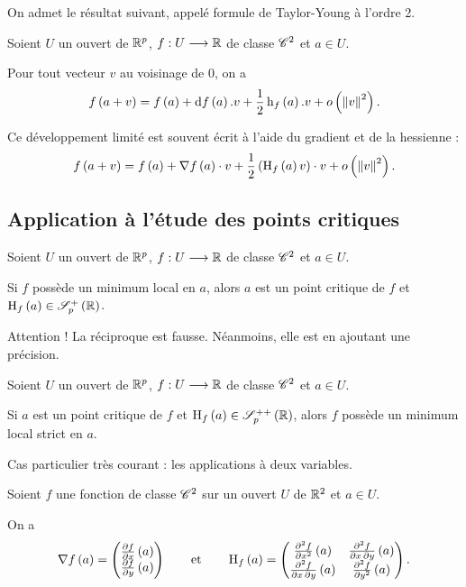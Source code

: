 On admet le résultat suivant, appelé formule de Taylor-Young à l'ordre 2.

\begin{prop}
Soient \(U\) un ouvert de \(\mathbb{R}^p\), \(f:U\longrightarrow\mathbb{R}\) de classe \(\mathscr{C}^{2}\) et \(a\in U\).

Pour tout vecteur \(v\) au voisinage de \(0\), on a \[f\paren{a+v}=f\paren{a}+\odif{f}\paren{a}.v+\dfrac{1}{2}\formehessienne{f}\paren{a}.v+\o{\norme{v}^2}.\]
\end{prop}

Ce développement limité est souvent écrit à l'aide du gradient et de la hessienne : \[f\paren{a+v}=f\paren{a}+\nabla f\paren{a}\scal v+\dfrac{1}{2}\paren{\hessienne{f}\paren{a}v}\scal v+\o{\norme{v}^2}.\]

\subsection{Application à l'étude des points critiques}

\begin{prop}
Soient \(U\) un ouvert de \(\mathbb{R}^p\), \(f:U\longrightarrow\mathbb{R}\) de classe \(\mathscr{C}^{2}\) et \(a\in U\).

Si \(f\) possède un minimum local en \(a\), alors \(a\) est un point critique de \(f\) et \(\hessienne{f}\paren{a}\in\sympos{p}[\R]\).
\end{prop}

\begin{rem}
Attention ! La réciproque est fausse. Néanmoins, elle est  en ajoutant une précision.
\end{rem}

\begin{prop}
Soient \(U\) un ouvert de \(\mathbb{R}^p\), \(f:U\longrightarrow\mathbb{R}\) de classe \(\mathscr{C}^{2}\) et \(a\in U\).

Si \(a\) est un point critique de \(f\) et \(\hessienne{f}\paren{a}\in\symdefpos{p}[\R]\), alors \(f\) possède un minimum local strict en \(a\).
\end{prop}

Cas particulier très courant : les applications à deux variables.

Soient \(f\) une fonction de classe \(\mathscr{C}^{2}\) sur un ouvert \(U\) de \(\mathbb{R}^2\) et \(a\in U\).

On a \[\nabla f\left(a\right)=\begin{pmatrix}\pdv{f}{x}\left(a\right)\\\pdv{f}{y}\left(a\right)\end{pmatrix}\qquad\text{et}\qquad\operatorname{H}_{f}\left(a\right)=\begin{pmatrix}
\pdv[order=2]{f}{x}\left(a\right) & \pdv{f}{x,y}\left(a\right) \\
\pdv{f}{x,y}\left(a\right) & \pdv[order=2]{f}{y}\left(a\right)
\end{pmatrix}.\]

